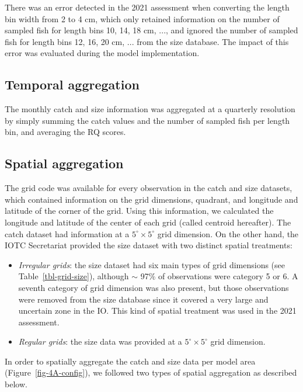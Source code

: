 \documentclass[
]{scrartcl}
\providecommand{\tightlist}{%
  \setlength{\itemsep}{0pt}\setlength{\parskip}{0pt}}\usepackage{longtable,booktabs,array}
\begin{document}
There was an error detected in the 2021 assessment when converting the
length bin width from 2 to 4 cm, which only retained information on the
number of sampled fish for length bins 10, 14, 18 cm, \(...\), and
ignored the number of sampled fish for length bins 12, 16, 20 cm,
\(...\) from the size database. The impact of this error was evaluated
during the model implementation.

\subsection{Temporal aggregation}\label{temporal-aggregation}

The monthly catch and size information was aggregated at a quarterly
resolution by simply summing the catch values and the number of sampled
fish per length bin, and averaging the RQ scores.

\subsection{Spatial aggregation}\label{spatial-aggregation}

The grid code was available for every observation in the catch and size
datasets, which contained information on the grid dimensions, quadrant,
and longitude and latitude of the corner of the grid. Using this
information, we calculated the longitude and latitude of the center of
each grid (called centroid hereafter). The catch dataset had information
at a \(5^\circ\times 5^\circ\) grid dimension. On the other hand, the
IOTC Secretariat provided the size dataset with two distinct spatial
treatments:

\begin{itemize}
\tightlist
\item
  \emph{Irregular grids}: the size dataset had six main types of grid
  dimensions (see Table~\ref{tbl-grid-size}), although \(\sim\) 97\% of
  observations were category 5 or 6. A seventh category of grid
  dimension was also present, but those observations were removed from
  the size database since it covered a very large and uncertain zone in
  the IO. This kind of spatial treatment was used in the 2021
  assessment.
\item
  \emph{Regular grids}: the size data was provided at a
  \(5^\circ\times 5^\circ\) grid dimension.
\end{itemize}

In order to spatially aggregate the catch and size data per model area
(Figure~\ref{fig-4A-config}), we followed two types of spatial
aggregation as described below.
\end{document}
